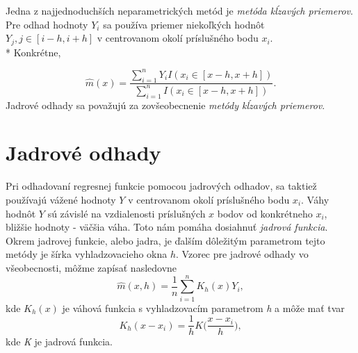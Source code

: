 Jedna z najjednoduchších neparametrických metód je \textit{ metóda kĺzavých priemerov}. Pre odhad hodnoty $Y_i$ sa používa priemer niekoľkých hodnôt $Y_j,  j\in [i-h,i+h]$ v centrovanom okolí príslušného bodu $x_i$. \\*
Konkrétne,
 
\begin{equation}
\hat{m}(x) = \dfrac{\sum\limits_{i=1}^{n}  Y_i I (x_i  \in  [x - h, x + h])}{\sum\limits_{i=1}^{n} I(x_i  \in  [x - h, x + h])}.
\end{equation}
Jadrové odhady sa považujú za zovšeobecnenie \textit{metódy kĺzavých priemerov}.


\section{Jadrové odhady}

Pri odhadovaní regresnej funkcie pomocou jadrových odhadov, sa taktiež používajú vážené hodnoty $Y$ v centrovanom okolí príslušného bodu $x_i$. Váhy hodnôt $Y$ sú závislé na vzdialenosti príslušných $x$ bodov od konkrétneho $x_i$, bližšie hodnoty  -  väčšia váha. Toto nám pomáha dosiahnuť \textit{jadrová funkcia}. Okrem jadrovej funkcie, alebo jadra, je ďalším dôležitým parametrom tejto metódy je šírka vyhladzovacieho okna $h$.
Vzorec pre jadrové odhady vo všeobecnosti, môžme zapísať nasledovne
\begin{equation}
\hat{m}(x,h) = \frac{1}{n}\sum\limits_{i=1}^{n} K_h(x)Y_i,
\end{equation}
kde $K_h(x)$ je váhová funkcia s vyhladzovacím parametrom \textit{h} a môže mať tvar
\begin{equation}
K_h(x - x_i) = \frac{1}{h}K\Big(\frac{x-x_i}{h}\Big),
\end{equation}
kde \textit{K} je jadrová funkcia.

